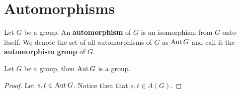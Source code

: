 \section{Automorphisms}
\label{section_4.4}

\begin{definition}
  Let $G$ be a group. An \textbf{automorphism} of $G$ is an isomorphism from
  $G$ onto itself. We denote the set of all automorphisms of $G$ as $\operatorname{Aut}{G}$
  and call it the \textbf{automorphism group} of $G$.
\end{definition}

\begin{proposition}\label{proposition_4.4.1}
  Let $G$ be a group, then  $\operatorname{Aut}{G}$ is a group.
\end{proposition}
\begin{proof}
  Let $s,t \in \operatorname{Aut}{G}$. Notice then that $s,t \in A(G)$.
\end{proof}


